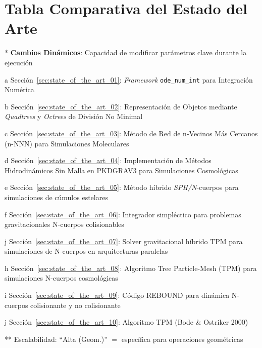 \section{Tabla Comparativa del Estado del Arte}
\newlength{\firstcolwidth}
\setlength{\firstcolwidth}{2.8cm}
\newlength{\desccolwidth}
\setlength{\desccolwidth}{\dimexpr\textwidth-\firstcolwidth-3.5cm\relax}

\begin{ThreePartTable}
\renewcommand{\arraystretch}{1.3} %
\scriptsize %

\begin{TableNotes}
    \item[*] \textbf{Cambios Dinámicos}: Capacidad de modificar parámetros clave durante la ejecución
    \item[a] Sección~\ref{sec:state_of_the_art_01}: \textit{Framework} \texttt{ode\_num\_int} para Integración Numérica
    \item[b] Sección~\ref{sec:state_of_the_art_02}: Representación de Objetos mediante \textit{Quadtrees} y \textit{Octrees} de División No Minimal
    \item[c] Sección~\ref{sec:state_of_the_art_03}: Método de Red de n-Vecinos Más Cercanos (n-NNN) para Simulaciones Moleculares
    \item[d] Sección~\ref{sec:state_of_the_art_04}: Implementación de Métodos Hidrodinámicos Sin Malla en PKDGRAV3 para Simulaciones Cosmológicas
    \item[e] Sección~\ref{sec:state_of_the_art_05}: Método híbrido \textit{SPH/N}-cuerpos para simulaciones de cúmulos estelares
    \item[f] Sección~\ref{sec:state_of_the_art_06}: Integrador simpléctico para problemas gravitacionales N-cuerpos colisionables
    \item[j] Sección~\ref{sec:state_of_the_art_07}: Solver gravitacional híbrido TPM para simulaciones de N-cuerpos en arquitecturas paralelas
    \item[h] Sección~\ref{sec:state_of_the_art_08}: Algoritmo Tree Particle-Mesh (TPM) para simulaciones N-cuerpos cosmológicas
    \item[i] Sección~\ref{sec:state_of_the_art_09}: Código REBOUND para dinámica N-cuerpos colisionante y no colisionante
    \item[j] Sección~\ref{sec:state_of_the_art_10}: Algoritmo TPM (Bode \& Ostriker 2000)
    \item[**] Escalabilidad: ``Alta (Geom.)'' $=$ específica para operaciones geométricas
\end{TableNotes}


\end{ThreePartTable}
